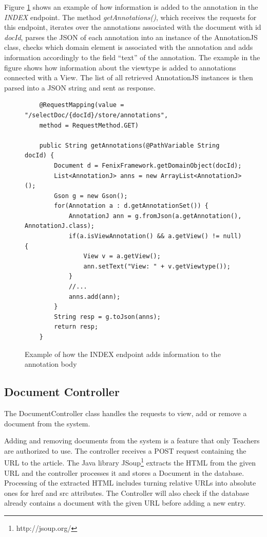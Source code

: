 Figure \ref{figure:annotationControllerIndex} shows an example of how information is added to the annotation in the \textit{INDEX} endpoint. The method \textit{getAnnotations()}, which receives the requests for this endpoint, iterates over the annotations associated with the document with id \textit{docId}, parses the JSON of each annotation into an instance of the AnnotationJS class, checks which domain element is associated with the annotation and adds information accordingly to the field ``text'' of the annotation. The example in the figure shows how information about the viewtype is added to annotations connected with a View. The list of all retrieved AnnotationJS instances is then parsed into a JSON string and sent as response.

\begin{figure}[h]
\lstset{style=customjava}
\begin{lstlisting}
	@RequestMapping(value = "/selectDoc/{docId}/store/annotations", 
	method = RequestMethod.GET)
	
	public String getAnnotations(@PathVariable String docId) {
		Document d = FenixFramework.getDomainObject(docId);
		List<AnnotationJ> anns = new ArrayList<AnnotationJ>();
		Gson g = new Gson();
		for(Annotation a : d.getAnnotationSet()) {
			AnnotationJ ann = g.fromJson(a.getAnnotation(), AnnotationJ.class);
			if(a.isViewAnnotation() && a.getView() != null) {
				View v = a.getView();
				ann.setText("View: " + v.getViewtype());
			}
			//...			
			anns.add(ann);
		}
		String resp = g.toJson(anns);
		return resp;
	}		
\end{lstlisting}
\caption{Example of how the INDEX endpoint adds information to the annotation body}
\label{figure:annotationControllerIndex}
\end{figure}

\subsection{Document Controller}
\label{subsection:documentController}
The DocumentController class handles the requests to view, add or remove a document from the system.

Adding and removing documents from the system is a feature that only Teachers are authorized to use. The controller receives a POST request containing the URL to the article. The Java library JSoup\footnote{http://jsoup.org/} extracts the HTML from the given URL and the controller processes it and stores a Document in the database. Processing of the extracted HTML includes turning relative URLs into absolute ones for href and src attributes.
The Controller will also check if the database already contains a document with the given URL before adding a new entry. 

